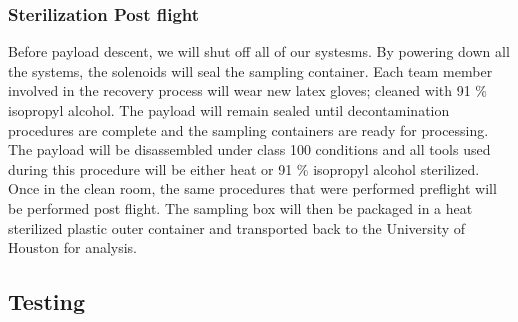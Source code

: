\subsubsection{Sterilization Post flight}
Before payload descent, we will shut off all of our systesms. By powering down all the systems, the solenoids will seal the sampling container. Each team member involved in the recovery process will wear new latex gloves; cleaned with 91 \% isopropyl alcohol. The payload will remain sealed until decontamination procedures are complete and the sampling containers are ready for processing. The payload will be disassembled under class 100 conditions and all tools used during this procedure will be either heat or 91 \% isopropyl alcohol sterilized. Once in the clean room, the same procedures that were performed preflight will be performed post flight. The sampling box will then be packaged in a heat sterilized plastic outer container and transported back to the University of Houston for analysis.


\subsection{Testing}

